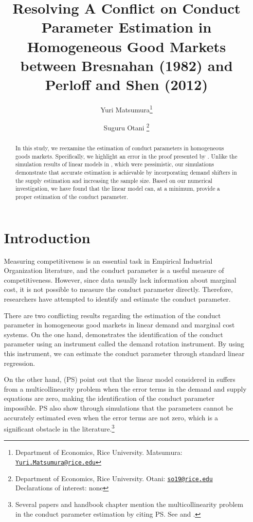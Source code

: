 \documentclass[11pt, a4paper]{article}
\title{Resolving A Conflict on Conduct Parameter Estimation in Homogeneous Good Markets between Bresnahan (1982) and Perloff and Shen (2012)}
\author{Yuri Matsumura\footnote{Department of Economics, Rice University. Matsumura: \texttt{\href{mailto:Yuri.Matsumura@rice.edu}{Yuri.Matsumura@rice.edu}}} \and Suguru Otani \footnote{Department of Economics, Rice University. Otani: \texttt{\href{mailto:so19@rice.edu}{so19@rice.edu}}\\
Declarations of interest: none}}
\begin{document}
\maketitle

\begin{abstract}
    In this study, we reexamine the estimation of conduct parameters in homogeneous goods markets. Specifically, we highlight an error in the proof presented by \cite{perloff2012collinearity}. Unlike the simulation results of linear models in \cite{perloff2012collinearity}, which were pessimistic, our simulations demonstrate that accurate estimation is achievable by incorporating demand shifters in the supply estimation and increasing the sample size. Based on our numerical investigation, we have found that the linear model can, at a minimum, provide a proper estimation of the conduct parameter.
\end{abstract}


\section{Introduction}
Measuring competitiveness is an essential task in Empirical Industrial Organization literature, and the conduct parameter is a useful measure of competitiveness. 
However, since data usually lack information about marginal cost, it is not possible to measure the conduct parameter directly. 
Therefore, researchers have attempted to identify and estimate the conduct parameter.

There are two conflicting results regarding the estimation of the conduct parameter in homogeneous good markets in linear demand and marginal cost systems. 
On the one hand, \cite{bresnahan1982oligopoly} demonstrates the identification of the conduct parameter using an instrument called the demand rotation instrument.
By using this instrument, we can estimate the conduct parameter through standard linear regression.

On the other hand, \cite{perloff2012collinearity} (PS) point out that the linear model considered in  \cite{bresnahan1982oligopoly} suffers from a multicollinearity problem when the error terms in the demand and supply equations are zero, making the identification of the conduct parameter impossible. 
PS also show through simulations that the parameters cannot be accurately estimated even when the error terms are not zero, which is a significant obstacle in the literature.\footnote{Several papers and handbook chapter mention the multicollinearity problem in the conduct parameter estimation by citing PS. See \citet{claessensWhatDrivesBank2004, coccoreseMultimarketContactCompetition2013, coccoreseWhatAffectsBank2021, garciaMarketStructuresProduction2020, kumbhakarNewMethodEstimating2012, perekhozhukRegionalLevelAnalysisOligopsony2015} and \citet{shafferMarketPowerCompetition2017}.}
\end{document}
